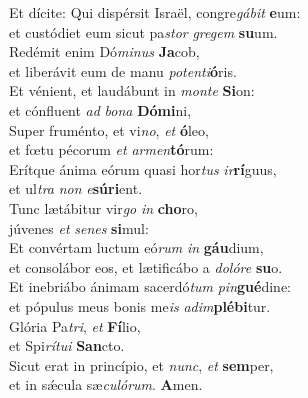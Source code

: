 \evenverse Et dícite: Qui dispérsit Israël, congre\textit{gá}\textit{bit} \textbf{e}um:~\*\\
\evenverse et custódiet eum sicut pa\textit{stor} \textit{gre}\textit{gem} \textbf{su}um.\\
\oddverse Redémit enim Dó\textit{mi}\textit{nus} \textbf{Ja}cob,~\*\\
\oddverse et liberávit eum de manu \textit{po}\textit{ten}\textit{ti}\textbf{ó}ris.\\
\evenverse Et vénient, et laudábunt in \textit{mon}\textit{te} \textbf{Si}on:~\*\\
\evenverse et cónfluent \textit{ad} \textit{bo}\textit{na} \textbf{Dó}\textbf{mi}ni,\\
\oddverse Super fruménto, et vi\textit{no}, \textit{et} \textbf{ó}leo,~\*\\
\oddverse et fœtu pécorum \textit{et} \textit{ar}\textit{men}\textbf{tó}rum:\\
\evenverse Erítque ánima eórum quasi hor\textit{tus} \textit{ir}\textbf{rí}guus,~\*\\
\evenverse et ul\textit{tra} \textit{non} \textit{e}\textbf{sú}\textbf{ri}ent.\\
\oddverse Tunc lætábitur vir\textit{go} \textit{in} \textbf{cho}ro,~\*\\
\oddverse júvenes \textit{et} \textit{se}\textit{nes} \textbf{si}mul:\\
\evenverse Et convértam luctum eó\textit{rum} \textit{in} \textbf{gáu}dium,~\*\\
\evenverse et consolábor eos, et lætificábo a \textit{do}\textit{ló}\textit{re} \textbf{su}o.\\
\oddverse Et inebriábo ánimam sacerdó\textit{tum} \textit{pin}\textbf{gué}dine:~\*\\
\oddverse et pópulus meus bonis me\textit{is} \textit{a}\textit{dim}\textbf{plé}\textbf{bi}tur.\\
\evenverse Glória Pa\textit{tri}, \textit{et} \textbf{Fí}lio,~\*\\
\evenverse et Spi\textit{rí}\textit{tu}\textit{i} \textbf{San}cto.\\
\oddverse Sicut erat in princípio, et \textit{nunc}, \textit{et} \textbf{sem}per,~\*\\
\oddverse et in sǽcula sæ\textit{cu}\textit{ló}\textit{rum}. \textbf{A}men.\\
